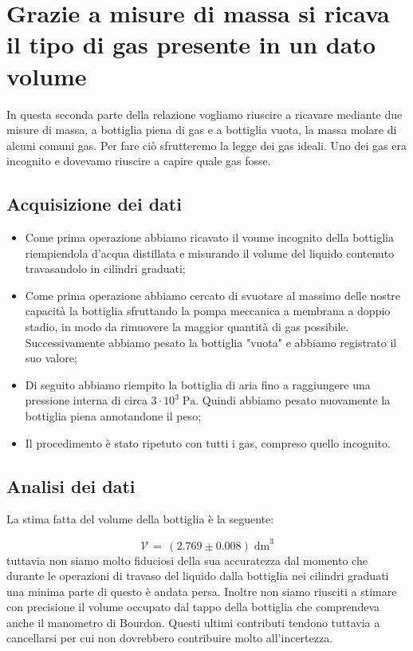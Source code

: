 \section{Grazie a misure di massa si ricava il tipo di gas presente in un dato volume}   

In questa seconda parte della relazione vogliamo riuscire a ricavare mediante due misure di massa,
a bottiglia piena di gas e a bottiglia vuota, la massa molare di alcuni comuni gas. Per fare ciò
sfrutteremo la legge dei gas ideali. Uno dei gas era incognito e dovevamo riuscire a capire quale gas fosse.

\subsection{Acquisizione dei dati}

\begin{itemize}
	\item{Come prima operazione abbiamo ricavato il voume incognito della bottiglia riempiendola d'acqua distillata e misurando il volume del liquido contenuto travasandolo in cilindri graduati;}
	\item{Come prima operazione abbiamo cercato di svuotare al massimo delle nostre capacità la bottiglia sfruttando la pompa meccanica a membrana a doppio stadio, in modo da rimuovere la maggior quantità di gas possibile. Successivamente abbiamo pesato la bottiglia "vuota" e abbiamo registrato il suo valore;}
	\item{Di seguito abbiamo riempito la bottiglia di aria fino a raggiungere una pressione interna di circa $3 \cdot 10^3 \; \si{\pascal}$. Quindi abbiamo pesato nuovamente la bottiglia piena annotandone il peso;}
	\item{Il procedimento è stato ripetuto con tutti i gas, compreso quello incognito.}
\end{itemize}

\subsection{Analisi dei dati}

La stima fatta del volume della bottiglia è la seguente:

\begin{equation}
	\mathcal{V} \, = \, (2.769 \pm 0.008) \; \si{\deci\meter}^3  
\end{equation}
%
tuttavia non siamo molto fiduciosi della sua accuratezza dal momento che durante le operazioni di
travaso del liquido dalla bottiglia nei cilindri graduati una minima parte di questo è andata persa.
Inoltre non siamo riusciti a stimare con precisione il volume occupato dal tappo della bottiglia che
comprendeva anche il manometro di Bourdon. Questi ultimi contributi tendono tuttavia a cancellarsi
per cui non dovrebbero contribuire molto all'incertezza.

